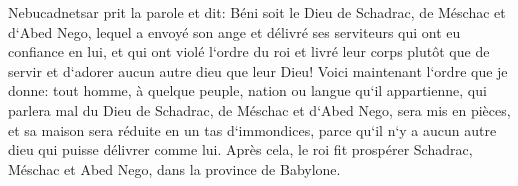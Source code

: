 \verse Nebucadnetsar prit la parole et dit: Béni soit le Dieu de Schadrac, de Méschac et d`Abed Nego, lequel a envoyé son ange et délivré ses serviteurs qui ont eu confiance en lui, et qui ont violé l`ordre du roi et livré leur corps plutôt que de servir et d`adorer aucun autre dieu que leur Dieu! 
\verse Voici maintenant l`ordre que je donne: tout homme, à quelque peuple, nation ou langue qu`il appartienne, qui parlera mal du Dieu de Schadrac, de Méschac et d`Abed Nego, sera mis en pièces, et sa maison sera réduite en un tas d`immondices, parce qu`il n`y a aucun autre dieu qui puisse délivrer comme lui. 
\verse Après cela, le roi fit prospérer Schadrac, Méschac et Abed Nego, dans la province de Babylone. 

\chapter{}

